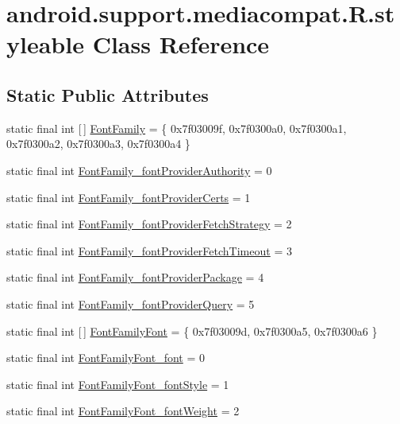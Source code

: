 \hypertarget{classandroid_1_1support_1_1mediacompat_1_1R_1_1styleable}{}\section{android.\+support.\+mediacompat.\+R.\+styleable Class Reference}
\label{classandroid_1_1support_1_1mediacompat_1_1R_1_1styleable}
\subsection*{Static Public Attributes}
\begin{DoxyCompactItemize}
\item 
static final int \mbox{[}$\,$\mbox{]} \mbox{\hyperlink{classandroid_1_1support_1_1mediacompat_1_1R_1_1styleable_a52c18faf466a6047f0ef99ff06f24d11}{Font\+Family}} = \{ 0x7f03009f, 0x7f0300a0, 0x7f0300a1, 0x7f0300a2, 0x7f0300a3, 0x7f0300a4 \}
\item 
static final int \mbox{\hyperlink{classandroid_1_1support_1_1mediacompat_1_1R_1_1styleable_a4235e49291443797bfb83152ca627c3d}{Font\+Family\+\_\+font\+Provider\+Authority}} = 0
\item 
static final int \mbox{\hyperlink{classandroid_1_1support_1_1mediacompat_1_1R_1_1styleable_ab703e2fe634559f11af5e65a675bc409}{Font\+Family\+\_\+font\+Provider\+Certs}} = 1
\item 
static final int \mbox{\hyperlink{classandroid_1_1support_1_1mediacompat_1_1R_1_1styleable_aa140fce064e6d67d3de2ab90d5d0bdd2}{Font\+Family\+\_\+font\+Provider\+Fetch\+Strategy}} = 2
\item 
static final int \mbox{\hyperlink{classandroid_1_1support_1_1mediacompat_1_1R_1_1styleable_ae2122ae301debf7c5ba1ae8ad75ac1a7}{Font\+Family\+\_\+font\+Provider\+Fetch\+Timeout}} = 3
\item 
static final int \mbox{\hyperlink{classandroid_1_1support_1_1mediacompat_1_1R_1_1styleable_a091f90561a26b591650c7a0068dc94ca}{Font\+Family\+\_\+font\+Provider\+Package}} = 4
\item 
static final int \mbox{\hyperlink{classandroid_1_1support_1_1mediacompat_1_1R_1_1styleable_aba9468cea16882d62306ce2ab1c3abc4}{Font\+Family\+\_\+font\+Provider\+Query}} = 5
\item 
static final int \mbox{[}$\,$\mbox{]} \mbox{\hyperlink{classandroid_1_1support_1_1mediacompat_1_1R_1_1styleable_ab335f4196bd2d829025326ff3efbcda2}{Font\+Family\+Font}} = \{ 0x7f03009d, 0x7f0300a5, 0x7f0300a6 \}
\item 
static final int \mbox{\hyperlink{classandroid_1_1support_1_1mediacompat_1_1R_1_1styleable_a6023dc6f9508d9725f106efd6e2f91f0}{Font\+Family\+Font\+\_\+font}} = 0
\item 
static final int \mbox{\hyperlink{classandroid_1_1support_1_1mediacompat_1_1R_1_1styleable_aba1bc730695a4e66ef6cb7945eb8ea1b}{Font\+Family\+Font\+\_\+font\+Style}} = 1
\item 
static final int \mbox{\hyperlink{classandroid_1_1support_1_1mediacompat_1_1R_1_1styleable_a3e4dffd2fc80e148b73a70308ab7c0a7}{Font\+Family\+Font\+\_\+font\+Weight}} = 2
\end{DoxyCompactItemize}


